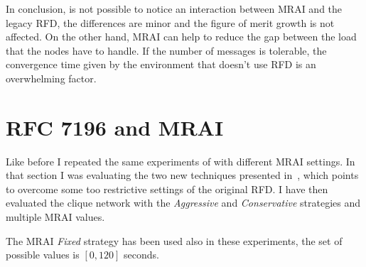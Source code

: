 In conclusion, is not possible to notice an interaction between \ac{MRAI} and the legacy
\ac{RFD}, the differences are minor and the figure of merit growth is not
affected.
On the other hand, \ac{MRAI} can help to reduce the gap between the load that
the nodes have to handle.
If the number of messages is tolerable, the convergence time given by the
environment that doesn't use \ac{RFD} is an overwhelming factor.


\section{RFC 7196 and MRAI}
\label{sec:bgp_rfd_comparison}

%
%

Like before I repeated the same experiments of  with
different \ac{MRAI} settings.
In that section I was evaluating the two new techniques presented in~\cite{rfc7196},
which points to overcome some too restrictive settings of the original \ac{RFD}.
I have then evaluated the clique network with the \textit{Aggressive} and
\textit{Conservative} strategies and multiple \ac{MRAI} values.

The \ac{MRAI} \textit{Fixed} strategy has been used also in these experiments,
the set of possible values is \([0, 120]\) seconds.

